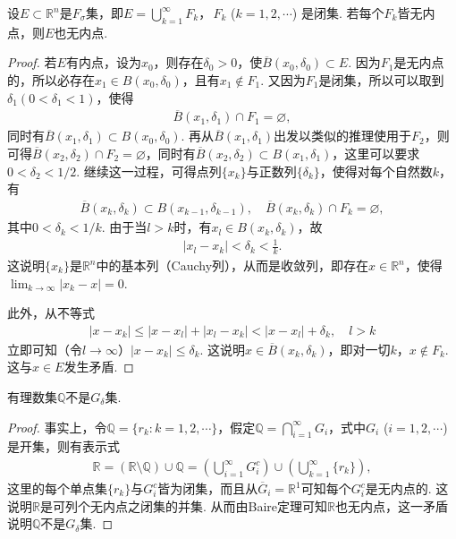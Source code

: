 \documentclass[../../main.tex]{subfiles}
\begin{document}
\begin{theorem}[Baire定理]\label{theorem:Baire定理}
设$E\subset\mathbb{R}^n$是$F_{\sigma}$集，即$E = \bigcup_{k = 1}^{\infty}F_k$，$\,F_k$ ($k = 1,2,\cdots$) 是闭集. 若每个$F_k$皆无内点，则$E$也无内点.
\end{theorem}
\begin{proof}
若$E$有内点，设为$x_0$，则存在$\delta_0>0$，使$\overline{B}(x_0,\delta_0)\subset E$. 因为$F_1$是无内点的，所以必存在$x_1\in B(x_0,\delta_0)$，且有$x_1\notin F_1$. 又因为$F_1$是闭集，所以可以取到$\delta_1(0<\delta_1<1)$，使得
\begin{align*}
\overline{B}(x_1,\delta_1)\cap F_1=\varnothing,
\end{align*}
同时有$\overline{B}(x_1,\delta_1)\subset B(x_0,\delta_0)$. 再从$\overline{B}(x_1,\delta_1)$出发以类似的推理使用于$F_2$，则可得$\overline{B}(x_2,\delta_2)\cap F_2=\varnothing$，同时有$\overline{B}(x_2,\delta_2)\subset B(x_1,\delta_1)$，这里可以要求$0<\delta_2<1/2$. 继续这一过程，可得点列$\{x_k\}$与正数列$\{\delta_k\}$，使得对每个自然数$k$，有
\begin{align*}
\overline{B}(x_k,\delta_k)\subset B(x_{k - 1},\delta_{k - 1}), \quad \overline{B}(x_k,\delta_k)\cap F_k=\varnothing,
\end{align*}
其中$0<\delta_k<1/k$. 由于当$l>k$时，有$x_l\in B(x_k,\delta_k)$，故
\begin{align*}
|x_l - x_k|<\delta_k<\frac{1}{k}.
\end{align*}
这说明$\{x_k\}$是$\mathbb{R}^n$中的基本列（Cauchy列），从而是收敛列，即存在$x\in\mathbb{R}^n$，使得$\lim_{k\to\infty}|x_k - x| = 0$.

此外，从不等式
\begin{align*}
|x - x_k|\leqslant|x - x_l|+|x_l - x_k|<|x - x_l|+\delta_k, \quad l>k
\end{align*}
立即可知（令$l\to\infty$）$|x - x_k|\leqslant\delta_k$. 这说明$x\in\overline{B}(x_k,\delta_k)$，即对一切$k$，$x\notin F_k$. 这与$x\in E$发生矛盾. 
\end{proof}

\begin{example}\label{example:例13}
有理数集$\mathbb{Q}$不是$G_{\delta}$集.
\end{example}
\begin{proof}
事实上，令$\mathbb{Q}=\{r_k: k = 1,2,\cdots\}$，假定$\mathbb{Q}=\bigcap_{i = 1}^{\infty}G_i$，式中$G_i$ ($i = 1,2,\cdots$) 是开集，则有表示式
\begin{align*}
\mathbb{R}=(\mathbb{R}\setminus\mathbb{Q})\cup\mathbb{Q}=\left(\bigcup_{i = 1}^{\infty}G_i^c\right)\cup\left(\bigcup_{k = 1}^{\infty}\{r_k\}\right),
\end{align*}
这里的每个单点集$\{r_k\}$与$G_i^c$皆为闭集，而且从$\overline{G}_i=\mathbb{R}^1$可知每个$G_i^c$是无内点的. 这说明$\mathbb{R}$是可列个无内点之闭集的并集. 从而由Baire定理可知$\mathbb{R}$也无内点，这一矛盾说明$\mathbb{Q}$不是$G_{\delta}$集. 
\end{proof}
\end{document}
